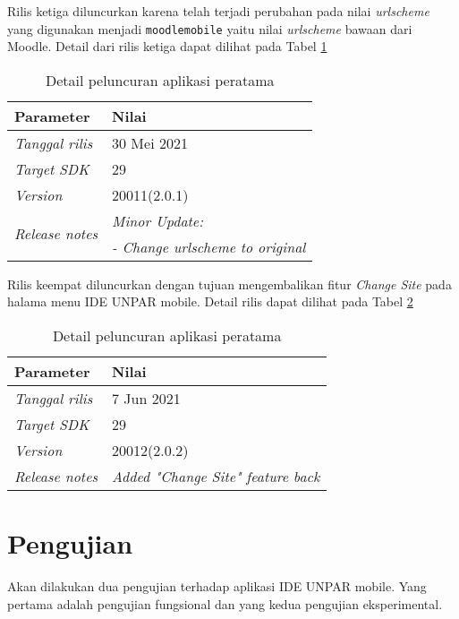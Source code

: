Rilis ketiga diluncurkan karena telah terjadi perubahan pada nilai \textit{urlscheme} yang digunakan menjadi \texttt{moodlemobile} yaitu nilai \textit{urlscheme} bawaan dari Moodle. Detail dari rilis ketiga dapat dilihat pada Tabel \ref{app:release:third}

\begin{table}[H]
\caption{Detail peluncuran aplikasi peratama}
\centering
\begin{tabular}{|l | l |}
\hline
\textbf{Parameter} & \textbf{Nilai} \\  \hline
\textit{Tanggal rilis}  &  30  Mei 2021 \\ \hline
\textit{Target SDK} & 29 \\ \hline
\textit{Version} &  20011(2.0.1) \\ \hline
\multirow{2}{*}{\textit{Release notes}} &  \textit{Minor Update:} \\ & \textit{- Change urlscheme to original} \\ 
\hline
\end{tabular}
\label{app:release:third}
\end{table}

Rilis keempat diluncurkan dengan tujuan mengembalikan fitur \textit{Change Site} pada halama menu IDE UNPAR mobile. Detail rilis dapat dilihat pada Tabel \ref{app:release:fourth}

\begin{table}[H]
\caption{Detail peluncuran aplikasi peratama}
\centering
\begin{tabular}{|l | l |}
\hline
\textbf{Parameter} & \textbf{Nilai} \\  \hline
\textit{Tanggal rilis}  &  7  Jun 2021 \\ \hline
\textit{Target SDK} & 29 \\ \hline
\textit{Version} &  20012(2.0.2) \\ \hline
\textit{Release notes} &  \textit{Added "Change Site" feature back}  \\ 
\hline
\end{tabular}
\label{app:release:fourth}
\end{table}



\section{Pengujian}

Akan dilakukan dua pengujian terhadap aplikasi IDE UNPAR mobile. Yang pertama adalah pengujian fungsional dan yang kedua pengujian eksperimental.


